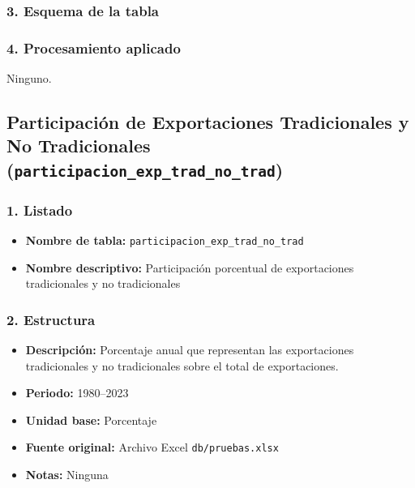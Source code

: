 \documentclass[12pt,a4paper]{article}
\begin{document}
\subsubsection*{3. Esquema de la tabla}

\subsubsection*{4. Procesamiento aplicado}
Ninguno.

\newpage
\subsection{Participación de Exportaciones Tradicionales y No Tradicionales\\
\small(\texttt{participacion\_exp\_trad\_no\_trad})}


\subsubsection*{1. Listado}
\begin{itemize}
  \item \textbf{Nombre de tabla:} \texttt{participacion\_exp\_trad\_no\_trad}
  \item \textbf{Nombre descriptivo:} Participación porcentual de exportaciones tradicionales y no tradicionales
\end{itemize}

\subsubsection*{2. Estructura}
\begin{itemize}
  \item \textbf{Descripción:} Porcentaje anual que representan las exportaciones tradicionales y no tradicionales sobre el total de exportaciones.
  \item \textbf{Periodo:} 1980--2023
  \item \textbf{Unidad base:} Porcentaje
  \item \textbf{Fuente original:} Archivo Excel \texttt{db/pruebas.xlsx}
  \item \textbf{Notas:} Ninguna
\end{itemize}
\end{document}
